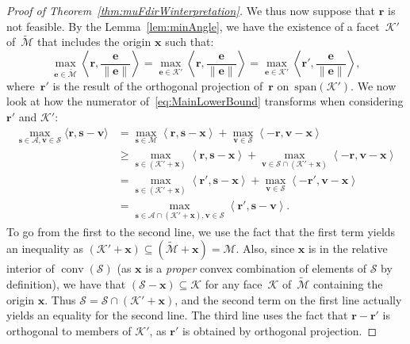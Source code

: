 \documentclass{article} %
\DeclareMathOperator*{\conv}{conv}
\newcommand{\domain}{\mathcal{M}} %
\newcommand{\x}{\bm{x}}
\newcommand{\s}{\bm{s}}
\newcommand{\vv}{\bm{v}} %
\newcommand{\Vertices}{\mathcal{A}} %
\renewcommand{\S}{\mathcal{S}}
\renewcommand{\r}{\bm{r}}
\newcommand{\innerProd}[2]{\left\langle #1 , #2 \right\rangle}
\newcommand{\innerProdCompressed}[2]{\langle #1 , #2 \rangle}
\newcommand{\Kface}{\mathcal{K}}
\newcommand{\err}{\bm{e}} %
\newcommand{\0}{\mathbf{0}} %
\begin{document}
\begin{proof}[Proof of Theorem~\ref{thm:muFdirWinterpretation}]
We thus now suppose that $\r$ is not feasible. By the Lemma~\ref{lem:minAngle},
we have the existence of a facet~$\Kface'$ of~$\tilde{\domain}$
that includes the origin $\x$ such that:
\begin{equation} \label{eq:angleEquality}
\max_{\err \in \tilde{\domain}} \innerProd{\r}{\frac{\err}{\|\err\|}} = \max_{\err \in \Kface'} \innerProd{\r}{\frac{\err}{\|\err\|}} = \max_{\err \in \Kface'} \innerProd{\r'}{\frac{\err}{\|\err\|}},
\end{equation}
where~$\r'$ is the result of the orthogonal projection of~$\r$ on~$\text{span}(\Kface')$.
We now look at how the numerator of~\eqref{eq:MainLowerBound} transforms
when considering $\r'$ and $\Kface'$:
\begin{align}
	\max_{\s \in \Vertices, \vv \in \S} \innerProdCompressed{\r}{\s - \vv}   &= 
	 \max_{\s \in \domain} \innerProd{\r}{ \s - \x} +
     \max_{\vv \in \S} \innerProd{-\r}{ \vv - \x} 
\nonumber \\
	 &\ge \max_{\s \in (\Kface'+\x)} \innerProd{\r}{  \s - \x } +
 \max_{\vv \in \S \cap (\Kface' + \x)}
\innerProd{-\r}{ \vv - \x} \nonumber \\
	 &=  \max_{\s \in (\Kface'+\x)} \innerProd{\r'}{  \s - \x } +
	 	  \max_{\vv \in \S } \innerProd{-\r'}{
\vv - \x} \nonumber \\
     &= \max_{\s \in \Vertices \cap (\Kface' + \x), \vv \in \S} \innerProd{\r'}{\s - \vv} .
     \label{eq:d1sf}
\end{align}
To go from the first to the second
line, we use the fact that the first term yields an inequality as $(\Kface'+\x)
\subseteq (\tilde{\domain}+ \x) = \domain$. Also, since 
$\x$ is in the relative interior of $\conv(\S)$ (as $\x$ is a \emph{proper} 
convex combination of elements of $\S$ by definition), we have that
$(\S - \x) \subseteq \Kface$ for any face~$\Kface$ of~$\tilde{\domain}$
containing the origin $\x$. Thus $\S = \S\cap (\Kface'+\x)$, and the
second term on the first line actually yields an equality for the second line. 
The third line uses the
fact that $\r - \r'$ is orthogonal to members of $\Kface'$,
as $\r'$ is obtained by orthogonal projection.


\end{proof}
\end{document}
